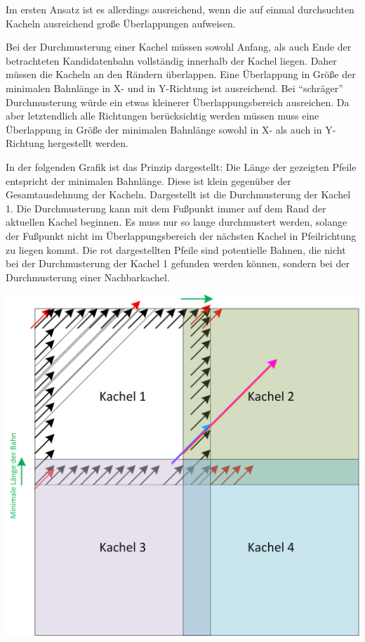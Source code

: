 \documentclass[
11pt, %
a4paper, %
oneside, %
pdfspacing, %
headinclude,
BCOR5mm, %
ngerman, %
bibtotocnumbered,
]{scrartcl}
\begin{document}
Im ersten Ansatz ist es allerdings ausreichend, wenn die auf einmal durchsuchten Kacheln ausreichend große Überlappungen aufweisen.

Bei der Durchmusterung einer Kachel müssen sowohl Anfang, als auch Ende der betrachteten Kandidatenbahn vollständig innerhalb der Kachel liegen. Daher müssen die Kacheln an den Rändern überlappen. Eine Überlappung in Größe der minimalen Bahnlänge in X- und in Y-Richtung ist ausreichend. Bei "`schräger"' Durchmusterung würde ein etwas kleinerer Überlappungsbereich ausreichen. Da aber letztendlich alle Richtungen berücksichtig werden müssen muss eine Überlappung in Größe der minimalen Bahnlänge sowohl in X- als auch in Y-Richtung hergestellt werden.

In der folgenden Grafik ist das Prinzip dargestellt: Die Länge der gezeigten Pfeile entspricht der minimalen Bahnlänge. Diese ist klein gegenüber der Gesamtausdehnung der Kacheln. Dargestellt ist die Durchmusterung der Kachel 1. Die Durchmusterung kann mit dem Fußpunkt immer auf dem Rand der aktuellen Kachel beginnen. Es muss nur so lange durchmustert werden, solange der Fußpunkt nicht im Überlappungsbereich der nächsten Kachel in Pfeilrichtung zu liegen kommt. Die rot dargestellten Pfeile sind potentielle Bahnen, die nicht bei der Durchmusterung der Kachel 1 gefunden werden können, sondern bei der Durchmusterung einer Nachbarkachel.

\includegraphics[width=\textwidth]{./drawings/UeberlappungKacheln.png}
\end{document}
